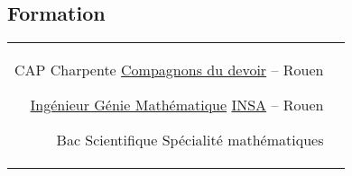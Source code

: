\documentclass[10pt]{article} %
\begin{document}
\begin{paracol}{2}

  \section{Formation}





  \begin{supertabular}{rl} %


    {CAP Charpente} %
    {} %
    {} %
    {\href{https://www.compagnons-du-devoir.com/}{Compagnons du devoir} -- Rouen} %


    {\href{https://www.insa-rouen.fr/formation/specialites-ingenieurses/genie-mathematique}{Ingénieur Génie Mathématique}} %
    {} %
    {} %
    {\href{https://www.insa-rouen.fr/}{INSA} -- Rouen} %


    {Bac Scientifique} %
    {} %
    {} %
    {Spécialité mathématiques} %


  \end{supertabular}


\end{paracol}
\end{document}
